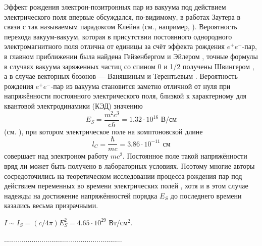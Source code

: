 \documentclass[a4paper,12pt]{article}         %
\begin{document}
\setcounter{page}{2}            %

\newpage                        %
\tableofcontents                %

\newpage






Эффект рождения электрон-позитронных пар из вакуума под действием
электрического поля впервые обсуждался, по-видимому, в работах
Заутера \cite{sauter} в связи с так называемым парадоксом Клейна
(см., например, \cite{zommerfeld}). Вероятность перехода
вакуум-вакуум, которая в присутствии постоянного однородного
электромагнитного поля отлична от единицы за счёт эффекта рождения
$e^+ e^-$-пар, в главном приближении была найдена Гейзенбергом и
Эйлером \cite{heisenberg}, точные формулы в случаях вакуума
заряженных частиц со спином 0 и 1/2 получены Швингером
\cite{schwinger}, а в случае векторных бозонов --- Ваняшиным и
Терентьевым \cite{vanyashin}. Вероятность рождения $e^+ e^-$-пар из
вакуума становится заметно отличной от нуля при напряжённости
постоянного электрического поля, близкой к характерному для
квантовой электродинамики (КЭД) значению
$$E_S=\frac{m^2c^3}{e\hbar}=1.32\cdot 10^{16}\,\,В/см $$                %
(см. \cite{sauter,zommerfeld,heisenberg,schwinger}), при котором
электрическое поле на комптоновской длине
 $$l_C =\frac{\hbar}{mc}=3.86\cdot 10^{-11}\,\,см$$
совершает над электроном работу $mc^2$. Постоянное поле такой
напряжённости вряд ли может быть получено в лабораторных условиях.
Поэтому многие авторы сосредоточились на теоретическом исследовании
процесса рождения пар под действием переменных во времени
электрических полей
\cite{bunkin,brezin,popov1,popov2,narozhny1,mostepanenko,marinov,grib,ringwald,popov3},
хотя и в этом случае надежды на достижение напряжённостей порядка
$E_S$ до последнего времени казались весьма призрачными.

\begin{center}
$I \sim I_S=(c/4\pi)E_S ^2=4.65\cdot 10^{29}$ Вт/см$^2$.                %
\end{center}

............................................................
\end{document}
